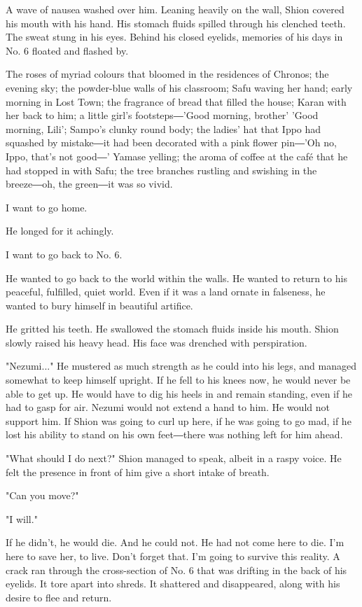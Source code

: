 A wave of nausea washed over him. Leaning heavily on the wall, Shion
covered his mouth with his hand. His stomach fluids spilled through his
clenched teeth. The sweat stung in his eyes. Behind his closed eyelids,
memories of his days in No. 6 floated and flashed by.

The roses of myriad colours that bloomed in the residences of Chronos;
the evening sky; the powder-blue walls of his classroom; Safu waving her
hand; early morning in Lost Town; the fragrance of bread that filled the
house; Karan with her back to him; a little girl's footsteps―'Good
morning, brother' 'Good morning, Lili'; Sampo's clunky round body; the
ladies' hat that Ippo had squashed by mistake―it had been decorated with
a pink flower pin―'Oh no, Ippo, that's not good―' Yamase yelling; the
aroma of coffee at the café that he had stopped in with Safu; the tree
branches rustling and swishing in the breeze―oh, the green―it was so
vivid.

I want to go home.

He longed for it achingly.

I want to go back to No. 6.

He wanted to go back to the world within the walls. He wanted to return
to his peaceful, fulfilled, quiet world. Even if it was a land ornate in
falseness, he wanted to bury himself in beautiful artifice.

He gritted his teeth. He swallowed the stomach fluids inside his mouth.
Shion slowly raised his heavy head. His face was drenched with
perspiration.

"Nezumi..." He mustered as much strength as he could into his legs, and
managed somewhat to keep himself upright. If he fell to his knees now,
he would never be able to get up. He would have to dig his heels in and
remain standing, even if he had to gasp for air. Nezumi would not extend
a hand to him. He would not support him. If Shion was going to curl up
here, if he was going to go mad, if he lost his ability to stand on his
own feet―there was nothing left for him ahead.

"What should I do next?" Shion managed to speak, albeit in a raspy
voice. He felt the presence in front of him give a short intake of
breath.

"Can you move?"

"I will."

If he didn't, he would die. And he could not. He had not come here to
die. I'm here to save her, to live. Don't forget that. I'm going to
survive this reality. A crack ran through the cross-section of No. 6
that was drifting in the back of his eyelids. It tore apart into shreds.
It shattered and disappeared, along with his desire to flee and return.

